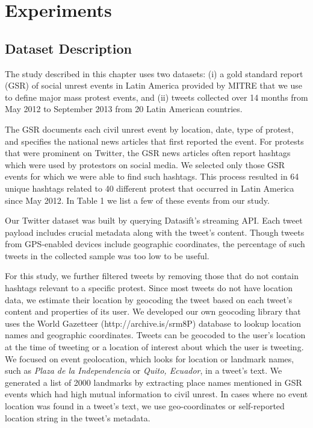 
\section{Experiments}
\subsection{Dataset Description}

The study described in this chapter uses two datasets: (i)
a gold standard report (GSR) of social unrest events in Latin America
provided by MITRE that we use to define
major mass protest events, and (ii)
tweets collected over 14 months from May 2012 to September 2013 from 20
Latin American countries.

The GSR documents each civil unrest event by location, date, type
of protest, and specifies the national news articles that
first reported the event. For protests that were prominent on Twitter, the
GSR news articles often report hashtags which were used by protestors
on social media. We selected only those GSR events for which we
were able to find such hashtags. This process resulted in 64
unique hashtags related to 40 different protest that occurred
in Latin America since May 2012. In Table 1 we list a few of
these events from our study.

Our Twitter dataset was built by querying Datasift's streaming API. Each tweet payload includes crucial metadata along with the tweet's content. Though tweets from GPS-enabled devices include geographic coordinates, the percentage of such tweets in the collected sample was too low to be useful.

For this study, we further filtered tweets by removing those that do not contain hashtags relevant to a specific protest. Since most tweets do not have location data, we estimate their location by geocoding the tweet based on each tweet's content and properties of its user. We developed our own geocoding library that uses the World Gazetteer (http://archive.is/srm8P) database to lookup location names and geographic coordinates. Tweets can be geocoded to the user's location at the time of tweeting or a location of interest about which the user is tweeting. We focused on event geolocation, which looks for location or landmark names, such as \textit{Plaza de la Independencia} or \textit{Quito, Ecuador}, in a tweet's text.  We generated a list of 2000 landmarks by extracting place names mentioned in GSR events which had high mutual information to civil unrest. In cases where no event location was found in a tweet's text, we use geo-coordinates or self-reported location string in the tweet's metadata.

